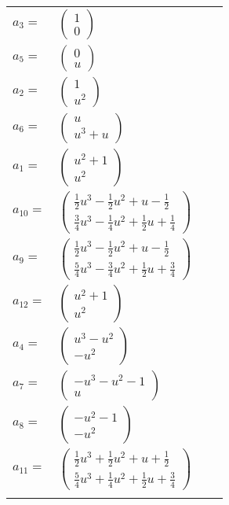 \documentclass[1p]{elsarticle_modified}
\theoremstyle{definition}
\begin{document}
\begin{tabular}{m{7pt} m{180pt} m{7pt} m{180pt} }
\flushright $a_{3}=$&$\begin{pmatrix}1\\0\end{pmatrix}$ \\
\flushright $a_{5}=$&$\begin{pmatrix}0\\u\end{pmatrix}$ \\
\flushright $a_{2}=$&$\begin{pmatrix}1\\u^2\end{pmatrix}$ \\
\flushright $a_{6}=$&$\begin{pmatrix}u\\u^3+u\end{pmatrix}$ \\
\flushright $a_{1}=$&$\begin{pmatrix}u^2+1\\u^2\end{pmatrix}$ \\
\flushright $a_{10}=$&$\begin{pmatrix}\frac{1}{2} u^3-\frac{1}{2} u^2+u-\frac{1}{2}\\\frac{3}{4} u^3-\frac{1}{4} u^2+\frac{1}{2} u+\frac{1}{4}\end{pmatrix}$ \\
\flushright $a_{9}=$&$\begin{pmatrix}\frac{1}{2} u^3-\frac{1}{2} u^2+u-\frac{1}{2}\\\frac{5}{4} u^3-\frac{3}{4} u^2+\frac{1}{2} u+\frac{3}{4}\end{pmatrix}$ \\
\flushright $a_{12}=$&$\begin{pmatrix}u^2+1\\u^2\end{pmatrix}$ \\
\flushright $a_{4}=$&$\begin{pmatrix}u^3- u^2\\- u^2\end{pmatrix}$ \\
\flushright $a_{7}=$&$\begin{pmatrix}- u^3- u^2-1\\u\end{pmatrix}$ \\
\flushright $a_{8}=$&$\begin{pmatrix}- u^2-1\\- u^2\end{pmatrix}$ \\
\flushright $a_{11}=$&$\begin{pmatrix}\frac{1}{2} u^3+\frac{1}{2} u^2+u+\frac{1}{2}\\\frac{5}{4} u^3+\frac{1}{4} u^2+\frac{1}{2} u+\frac{3}{4}\end{pmatrix}$\\&\end{tabular}
\end{document}
